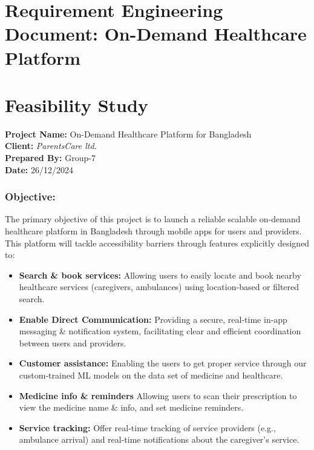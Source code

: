 \documentclass[12pt]{article}
\begin{document}



\newpage
\section*{Requirement Engineering Document: On-Demand Healthcare Platform}


\section{Feasibility Study}
\begin{itemize}
    \textbf{Project Name:} On-Demand Healthcare Platform for Bangladesh \\
    \textbf{Client:}   \textit{ParentsCare ltd.} \\
    \textbf{Prepared By:} Group-7 \\
    \textbf{Date:} 26/12/2024 
\end{itemize}

\subsubsection*{\textbf{Objective:}}
 The primary objective of this project is to launch a reliable scalable on-demand healthcare platform in Bangladesh through mobile apps for users and providers. This platform will tackle accessibility barriers through features explicitly designed to:
\begin{itemize}
    \item \textbf{Search \& book services:} Allowing users to easily locate and book nearby healthcare services (caregivers, ambulances) using location-based or filtered search.
    \item \textbf{Enable Direct Communication:} Providing a secure, real-time in-app messaging \& notification system, facilitating clear and efficient coordination between users and providers.
    \item \textbf{Customer assistance:} Enabling the users to get proper service through our custom-trained ML models on the data set of medicine and healthcare.
    \item \textbf{Medicine info \& reminders} Allowing users to scan their prescription to view the medicine name \& info, and set medicine reminders.
    \item \textbf{Service tracking:} Offer real-time tracking of service providers (e.g., ambulance arrival) and real-time notifications about the caregiver's service.
    
\end{itemize}
\end{document}
